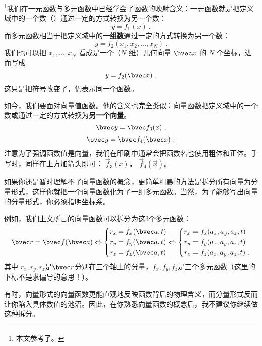 
\begin{issues}
\end{issues}


\footnote{本文参考了\cite{Thomas}。}我们在一元函数与多元函数中已经学会了函数的映射含义：一元函数就是把定义域中的一个数（）通过一定的方式转换为另一个数：
\begin{equation}
y=f_1(x)~.
\end{equation}
而多元函数相当于把定义域中的\textbf{一组数}通过一定的方式转换为另一个数：
\begin{equation}
y=f_2(x_1, x_2,...,x_N)~.
\end{equation}
我们也可以把 $x_1,\dots,x_N$ 看成是一个（$N$ 维）几何向量 $\bvec x$ 的 $N$ 个坐标，进而写成
\begin{equation}
y=f_2(\bvec x)~.
\end{equation}
这只是把符号改变了，仍表示同一个函数。

如今，我们要面对向量值函数。他的含义也完全类似：向量函数把定义域中的一个数或通过一定的方式转换为\textbf{另一个向量}。
\begin{equation}
\bvec y = \bvec f_3 (x)~.
\end{equation}
\begin{equation}
\bvec y = \bvec f_4(\bvec x)~.
\end{equation}
注意为了强调函数值是向量，我们在印刷中通常会把函数名也使用粗体和正体。手写时，同样在上方加箭头即可： $\vec f_3(x)$， $\vec f_4(\vec x)$。

如果你还是暂时理解不了向量函数的概念，更简单粗暴的方法是拆分所有向量为分量形式，这样你就把一个向量函数化为了一组多元函数。当然，为了能够写出向量的分量形式，你必须指明坐标系。

例如，我们上文所言的向量函数可以拆分为这$3$个多元函数：
$$
\bvec r = \bvec f (\bvec a)
\Leftrightarrow
\left \{
\begin{aligned}
r_x &= f_x(\bvec a, t)\\
r_y &= f_y(\bvec a, t)\\
r_z &= f_z(\bvec a, t)\\
\end{aligned}
\right.
\Leftrightarrow
\left \{
\begin{aligned}
r_x &= f_x(a_x,a_y,a_z,t)\\
r_y &= f_y(a_x,a_y,a_z,t)\\
r_z &= f_z(a_x,a_y,a_z,t)~.\\
\end{aligned}
\right.
$$
其中 $r_x, r_y, r_z$是$\bvec r$分别在三个轴上的分量，$f_x,f_y,f_z$是三个多元函数（这里的下标不是求偏导的意思！）。

有时，向量形式的向量函数更能直观地反映函数背后的物理含义，而分量形式反而让你陷入具体数值的池沼。因此，在你熟悉向量函数的概念后，我不建议你继续做这种拆分。
